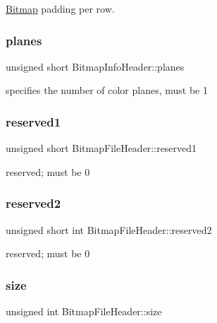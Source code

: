 \mbox{\hyperlink{struct_bitmap}{Bitmap}} padding per row. 

\mbox{\label{group__bitmap_ga9925e97e8bbc6b797afe2d22fbab45d6}} 
\subsubsection{\texorpdfstring{planes}{planes}}
{\footnotesize\ttfamily unsigned short Bitmap\+Info\+Header\+::planes}



specifies the number of color planes, must be 1 

\mbox{\label{group__bitmap_ga16d8cfe2edb9d109cea44ab94d1b701a}} 
\subsubsection{\texorpdfstring{reserved1}{reserved1}}
{\footnotesize\ttfamily unsigned short Bitmap\+File\+Header\+::reserved1}



reserved; must be 0 

\mbox{\label{group__bitmap_ga24130729dee5b8b9c1bd45f0a73c9a9d}} 
\subsubsection{\texorpdfstring{reserved2}{reserved2}}
{\footnotesize\ttfamily unsigned short int Bitmap\+File\+Header\+::reserved2}



reserved; must be 0 

\mbox{\label{group__bitmap_ga0dcad71d9b17783c4d296c2c6d00ede0}} 
\subsubsection{\texorpdfstring{size}{size}\hspace{0.1cm}{\footnotesize\ttfamily [1/2]}}
{\footnotesize\ttfamily unsigned int Bitmap\+File\+Header\+::size}



